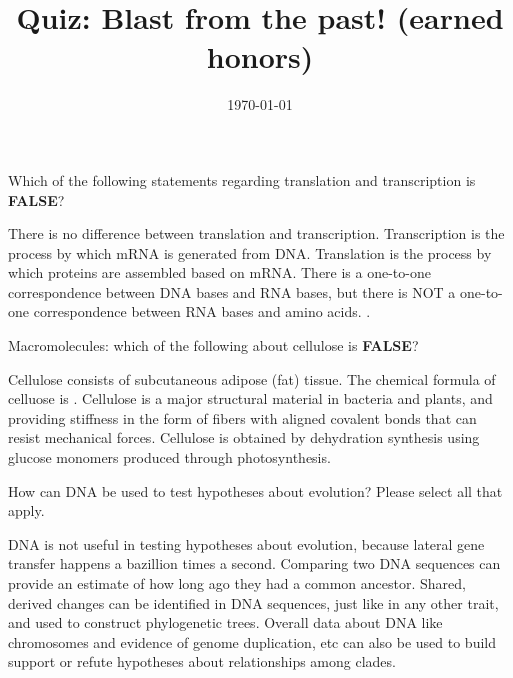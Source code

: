 \documentclass[quiz,addpoints,noanswers]{exam}
\title{Quiz: Blast from the past! (earned honors)}
\date{\today}
\author{\mobeardInstructorShort}
\begin{document}
\maketitle

\begin{questions}
\question[1] Which of the following statements regarding translation and transcription is \textbf{FALSE}?
\begin{choices}
\CorrectChoice There is no difference between translation and transcription.
\choice Transcription is the process by which mRNA is generated from DNA.
\choice Translation is the process by which proteins are assembled based on mRNA.
\choice There is a one-to-one correspondence between DNA bases and RNA bases, but there is NOT a one-to-one correspondence between RNA bases and amino acids. .
\end{choices}

\question[1] Macromolecules: which of the following about cellulose is \textbf{FALSE}?
\begin{choices}
\CorrectChoice Cellulose consists of subcutaneous adipose (fat) tissue.
\choice The chemical formula of celluose is . 
\choice Cellulose is a major structural material in bacteria and plants, and providing stiffness in the form of fibers with aligned covalent bonds that can resist mechanical forces.
\choice Cellulose is obtained by dehydration synthesis using glucose monomers produced through photosynthesis. 
\end{choices}

\question[1] How can DNA be used to test hypotheses about evolution? Please select all that apply. 
\begin{choices}
\choice DNA is not useful in testing hypotheses about evolution, because lateral gene transfer happens a bazillion times a second. 
\CorrectChoice Comparing two DNA sequences can provide an estimate of how long ago they had a common ancestor.
\CorrectChoice Shared, derived changes can be identified in DNA sequences, just like in any other trait, and used to construct phylogenetic trees. 
\CorrectChoice Overall data about DNA like chromosomes and evidence of genome duplication, etc can also be used to build support or refute hypotheses about relationships among clades. 
\end{choices}


\end{questions}
\end{document}
